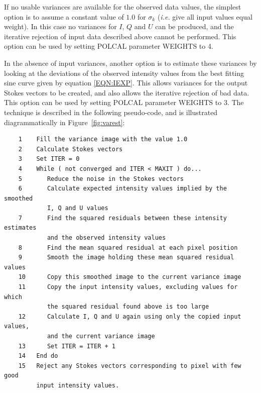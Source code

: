 \documentclass[twoside,11pt]{article}
\newcommand{\latex}[1]{#1}
\newcommand{\html}[1]{}
\renewcommand{\_}{\texttt{\symbol{95}}}
\begin{document}
If no usable variances are available for the observed data values, the
simplest option is to assume a constant value of $1.0$ for $\sigma_{k}$ 
(\emph{i.e.} give all input values equal weight). In this case no
variances for $I$, $Q$ and $U$ can be produced, and the iterative rejection
of input data described above cannot be performed. This option can be
used by setting POLCAL parameter WEIGHTS to 4.

In the absence of input variances, another option is to estimate these
variances by looking at the deviations of the observed intensity values
from the best fitting sine curve given by equation \ref{EQN:IEXP}. This
allows variances for the output Stokes vectors to be created, and also
allows the iterative rejection of bad data. This option can be used by
setting POLCAL parameter WEIGHTS to 3. The technique is described in the
following pseudo-code, and is illustrated diagrammatically in 
\latex{Figure~\ref{fig:varest}:} \html{the next figure:}

\begin{verbatim}
    1    Fill the variance image with the value 1.0
    2    Calculate Stokes vectors
    3    Set ITER = 0
    4    While ( not converged and ITER < MAXIT ) do...
    5       Reduce the noise in the Stokes vectors
    6       Calculate expected intensity values implied by the smoothed 
            I, Q and U values
    7       Find the squared residuals between these intensity estimates
            and the observed intensity values
    8       Find the mean squared residual at each pixel position
    9       Smooth the image holding these mean squared residual values
    10      Copy this smoothed image to the current variance image
    11      Copy the input intensity values, excluding values for which 
            the squared residual found above is too large
    12      Calculate I, Q and U again using only the copied input values, 
            and the current variance image
    13      Set ITER = ITER + 1
    14   End do
    15   Reject any Stokes vectors corresponding to pixel with few good
         input intensity values.
\end{verbatim}
\end{document}
